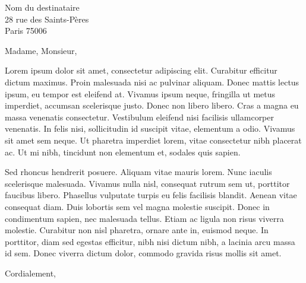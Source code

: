 \documentclass[12pt, a4paper, oneside, final]{lettre}
\begin{document}
\begin{letter}{ Nom du destinataire \\
                28 rue des Saints-Pères \\
                Paris 75006} %
    \date{le 11 avril 2023} %

    \opening{Madame, Monsieur,}
    Lorem ipsum dolor sit amet, consectetur adipiscing elit. Curabitur efficitur dictum maximus. Proin malesuada nisi ac pulvinar aliquam. Donec mattis lectus ipsum, eu tempor est eleifend at. Vivamus ipsum neque, fringilla ut metus imperdiet, accumsan scelerisque justo. Donec non libero libero. Cras a magna eu massa venenatis consectetur. Vestibulum eleifend nisi facilisis ullamcorper venenatis. In felis nisi, sollicitudin id suscipit vitae, elementum a odio. Vivamus sit amet sem neque. Ut pharetra imperdiet lorem, vitae consectetur nibh placerat ac. Ut mi nibh, tincidunt non elementum et, sodales quis sapien.

    Sed rhoncus hendrerit posuere. Aliquam vitae mauris lorem. Nunc iaculis scelerisque malesuada. Vivamus nulla nisl, consequat rutrum sem ut, porttitor faucibus libero. Phasellus vulputate turpis eu felis facilisis blandit. Aenean vitae consequat diam. Duis lobortis sem vel magna molestie suscipit. Donec in condimentum sapien, nec malesuada tellus. Etiam ac ligula non risus viverra molestie. Curabitur non nisl pharetra, ornare ante in, euismod neque. In porttitor, diam sed egestas efficitur, nibh nisi dictum nibh, a lacinia arcu massa id sem. Donec viverra dictum dolor, commodo gravida risus mollis sit amet.
    
    \closing{Cordialement,}
\end{letter}
\end{document}
